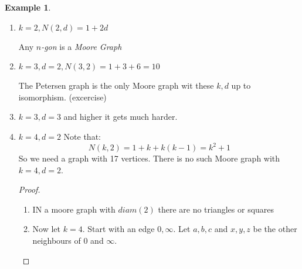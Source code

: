 \documentclass[]{article}
\theoremstyle{definition}
\newtheorem*{exmp}{Example}
\theoremstyle{remark}
\numberwithin{equation}{section}
\begin{document}
	\begin{exmp}
		\begin{enumerate}
			\item $k=2, N(2,d)  =1 + 2d$\\
				\begin{figure}[H]
					\centering
				\end{figure}
				Any \emph{$n$-gon} is a \emph{Moore Graph}

			\item $k=3, d=2, N(3,2) = 1 + 3 + 6 = 10$\\
				\begin{figure}[H]
					\centering
				\end{figure}
				The Petersen graph is the only Moore graph wit these $k, d$ up to isomorphism. (excercise)
			\item $k=3, d=3$ and higher it gets much harder.
			\item $k=4, d=2$ Note that:
				\[
					N(k,2) = 1 + k + k(k-1) = k^2 + 1
				\]
				So we need a graph with 17 vertices. There is no such Moore graph with $k=4, d=2$.
				\begin{proof}
					\begin{enumerate}
						\item IN a moore graph with $diam(2)$ there are no triangles or squares
						\item Now let $k=4$. Start with an edge $0, \infty$. Let $a,b,c$ and $x,y,z$ be the other neighbours of $0$ and $\infty$.


\end{enumerate}
\end{proof}
\end{enumerate}
\end{exmp}
\end{document}
